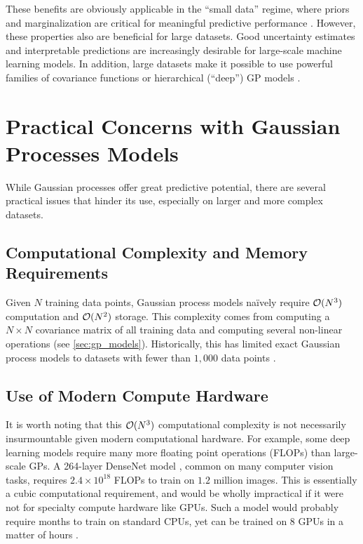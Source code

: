 %
\noindent
These benefits are obviously applicable in the ``small data'' regime, where priors and marginalization are critical for meaningful predictive performance \cite{rasmussen2001occam}.
However, these properties also are beneficial for large datasets.
Good uncertainty estimates and interpretable predictions are increasingly desirable for large-scale machine learning models.
In addition, large datasets make it possible to use powerful families of covariance functions \citep{wilson2013gaussian,wilson2016deep,benton2019function} or hierarchical (``deep'') GP models \cite{wilson2016deep,salimbeni2017doubly,jankowiak2020deep}.


\section{Practical Concerns with Gaussian Processes Models}

While Gaussian processes offer great predictive potential, there are several practical issues that hinder its use, especially on larger and more complex datasets.

\subsection{Computational Complexity and Memory Requirements}
Given $N$ training data points, Gaussian process models na\"{i}vely require $\bigo{N^3}$ computation and $\bigo{N^2}$ storage.
This complexity comes from computing a $N \times N$ covariance matrix of all training data and computing several non-linear operations (see \cref{sec:gp_models}).
Historically, this has limited exact Gaussian process models to datasets with fewer than $1,\!000$ data points \cite{hensman2013gaussian}.

\subsection{Use of Modern Compute Hardware}
It is worth noting that this $\bigo{N^3}$ computational complexity is not necessarily insurmountable given modern computational hardware.
For example, some deep learning models require many more floating point operations (FLOPs) than large-scale GPs.
A 264-layer DenseNet model \cite{huang2017densely}, common on many computer vision tasks, requires $2.4 \times 10^{18}$ FLOPs to train on $1.2$ million images.
This is essentially a cubic computational requirement, and would be wholly impractical if it were not for specialty compute hardware like GPUs.
Such a model would probably require months to train on standard CPUs, yet can be trained on 8 GPUs in a matter of hours \cite{howard2018training}.

